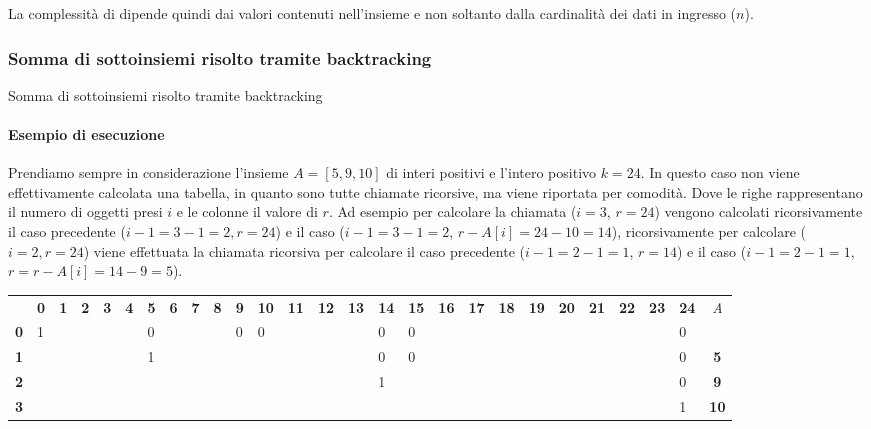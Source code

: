 \begin{observation}
La complessità di \subSetSum dipende quindi dai valori contenuti nell'insieme e non soltanto dalla cardinalità dei dati in ingresso (\(n\)).
\end{observation}

\subsubsection{Somma di sottoinsiemi risolto tramite backtracking}

\begin{algorithm}[H]
	\caption{Somma di sottoinsiemi risolto tramite backtracking}
	
\end{algorithm}

\paragraph{Esempio di esecuzione}
Prendiamo sempre in considerazione l'insieme \(A = [5,9,10]\) di interi positivi e l'intero positivo \(k = 24\).
In questo caso non viene effettivamente calcolata una tabella, in quanto sono tutte chiamate ricorsive, ma viene riportata per comodità.
Dove le righe rappresentano il numero di oggetti presi \(i\) e  le colonne il valore di \(r\).
Ad esempio per calcolare la chiamata (\(i=3\), \(r=24\)) vengono calcolati ricorsivamente il caso precedente (\(i-1 = 3-1 = 2, r = 24\)) e il caso (\(i-1 = 3-1 = 2\), \(r-A[i] = 24-10 = 14\)), ricorsivamente per calcolare (\(i=2, r=24\)) viene effettuata la chiamata ricorsiva per calcolare il caso precedente (\(i-1 = 2-1 = 1\), \(r = 14\)) e il caso (\(i-1 = 2-1 = 1\), \(r = r-A[i] = 14-9 = 5\)).

{
\setlength{\tabcolsep}{3pt}
\begin{tabularx}{\textwidth}{@{} l *{25}{ F{Y} } c @{}}
	\toprule
		& \textbf{0} & \textbf{1} & \textbf{2} & \textbf{3} & \textbf{4} & \textbf{5} & \textbf{6} & \textbf{7} & \textbf{8} & \textbf{9} & \textbf{10} & \textbf{11} & \textbf{12} & \textbf{13} & \textbf{14} & \textbf{15} & \textbf{16} & \textbf{17} & \textbf{18} & \textbf{19} & \textbf{20} & \textbf{21} & \textbf{22} & \textbf{23} & \textbf{24} & \emph{A}\\
		\textbf{0} & 1 &&&&& 0 &&&& 0 & 0 &&&& 0 & 0 &&&&&&&&& 0 & \\
	\lightrule
		\textbf{1} &&&&&& 1 &&&&&&&&& 0 & 0 &&&&&&&&& 0 & \textbf{5}\\
	\lightrule
		\textbf{2} &&&&&&&&&&&&&&& 1 &&&&&&&&&& 0 & \textbf{9}\\
	\lightrule
		\textbf{3} &&&&&&&&&&&&&&&&&&&&&&&&& 1 & \textbf{10}\\
	\bottomrule
\end{tabularx}
}

